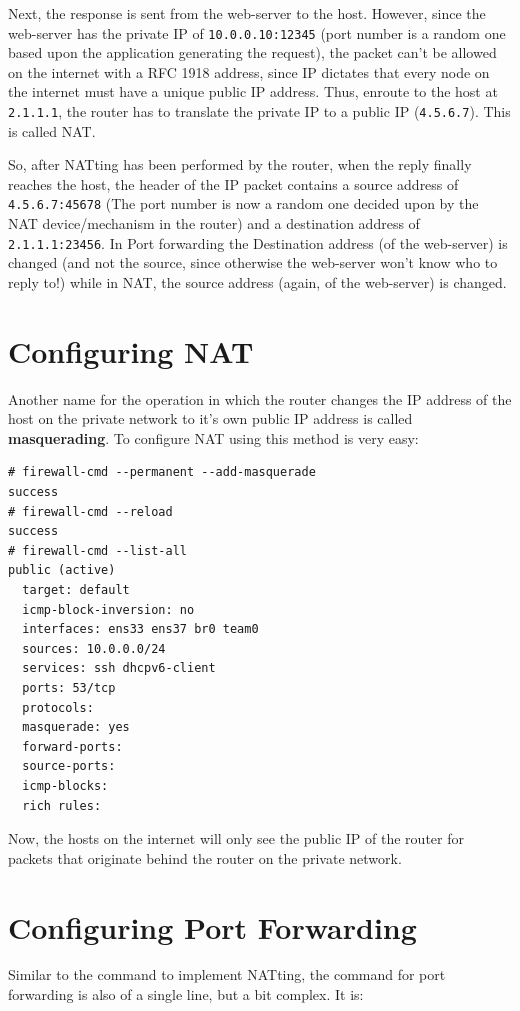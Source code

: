 Next, the response is sent from the web-server to the host. However, since the web-server has the private IP of \verb|10.0.0.10:12345| (port number is a random one based upon the application generating the request), the packet can't be allowed on the internet with a RFC 1918 address, since IP dictates that every node on the internet must have a unique public IP address. Thus, enroute to the host at \verb|2.1.1.1|, the router has to translate the private IP to a public IP (\verb|4.5.6.7|). This is called NAT. 

So, after NATting has been performed by the router, when the reply finally reaches the host, the header of the IP packet contains a source address of \verb|4.5.6.7:45678| (The port number is now a random one decided upon by the NAT device/mechanism in the router) and a destination address of \verb|2.1.1.1:23456|. In Port forwarding the Destination address (of the web-server) is changed (and not the source, since otherwise the web-server won't know who to reply to!) while in NAT, the source address (again, of the web-server) is changed. 

	\section{Configuring NAT}
Another name for the operation in which the router changes the IP address of the host on the private network to it's own public IP address is called \textbf{masquerading}. To configure NAT using this method is very easy:

\vspace{-15pt}
\begin{verbatim}
# firewall-cmd --permanent --add-masquerade 
success
# firewall-cmd --reload
success
# firewall-cmd --list-all
public (active)
  target: default
  icmp-block-inversion: no
  interfaces: ens33 ens37 br0 team0
  sources: 10.0.0.0/24
  services: ssh dhcpv6-client
  ports: 53/tcp
  protocols: 
  masquerade: yes
  forward-ports: 
  source-ports: 
  icmp-blocks: 
  rich rules: 
\end{verbatim}
\vspace{-10pt}	

\noindent
Now, the hosts on the internet will only see the public IP of the router for packets that originate behind the router on the private network. 

\section{Configuring Port Forwarding}
Similar to the command to implement NATting, the command for port forwarding is also of a single line, but a bit complex. It is:

